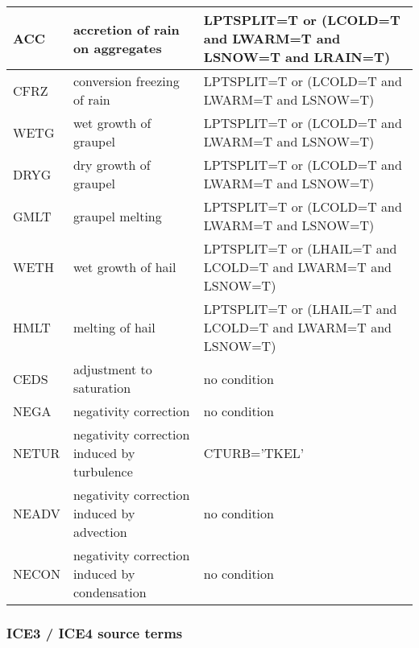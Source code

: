\begin{longtable} {|p{}|p{}|p{}|}
ACC    & accretion of rain on aggregates               & LPTSPLIT=T or (LCOLD=T and LWARM=T and LSNOW=T and LRAIN=T) \\\hline
CFRZ   & conversion freezing of rain                   & LPTSPLIT=T or (LCOLD=T and LWARM=T and LSNOW=T) \\\hline
WETG   & wet growth of graupel                         & LPTSPLIT=T or (LCOLD=T and LWARM=T and LSNOW=T) \\\hline
DRYG   & dry growth of graupel                         & LPTSPLIT=T or (LCOLD=T and LWARM=T and LSNOW=T) \\\hline
GMLT   & graupel melting                               & LPTSPLIT=T or (LCOLD=T and LWARM=T and LSNOW=T) \\\hline
WETH   & wet growth of hail                            & LPTSPLIT=T or (LHAIL=T and LCOLD=T and LWARM=T and LSNOW=T) \\\hline
HMLT   & melting of hail                               & LPTSPLIT=T or (LHAIL=T and LCOLD=T and LWARM=T and LSNOW=T) \\\hline
CEDS   & adjustment to saturation                      & no condition \\\hline
NEGA   & negativity correction                         & no condition \\\hline
NETUR  & negativity correction induced by turbulence   & CTURB='TKEL' \\\hline
NEADV  & negativity correction induced by advection    & no condition \\\hline
NECON  & negativity correction induced by condensation & no condition \\\hline
\end{longtable}

\subsubsection{ICE3 / ICE4 source terms}

